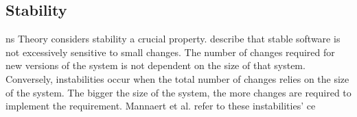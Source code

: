 \subsection{Stability} \label{subsec_on_stability}

\gls{ns} Theory considers stability a crucial property.
\textcite[269-270]{mannaert_normalized_2016} describe that stable software is not
excessively sensitive to small changes. The number of changes required for new versions of
the system is not dependent on the size of that system. Conversely, instabilities occur
when the total number of changes relies on the size of the system. The bigger the size of
the system, the more changes are required to implement the requirement. Mannaert et al.
\textcite[271]{mannaert_normalized_2016} refer to these instabilities' \gls{ce}